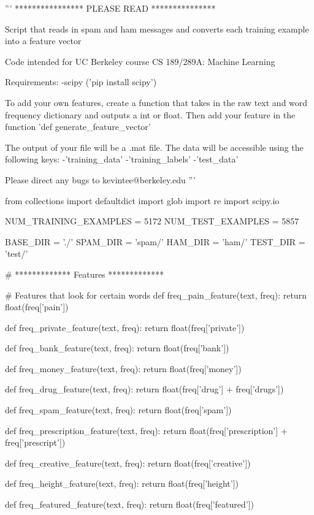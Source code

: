 \documentclass[11pt]{article}
\begin{document}
\begin{python}
'''
**************** PLEASE READ ***************

Script that reads in spam and ham messages and converts each training example
into a feature vector

Code intended for UC Berkeley course CS 189/289A: Machine Learning

Requirements:
-scipy ('pip install scipy')

To add your own features, create a function that takes in the raw text and
word frequency dictionary and outputs a int or float. Then add your feature
in the function 'def generate_feature_vector'

The output of your file will be a .mat file. The data will be accessible using
the following keys:
    -'training_data'
    -'training_labels'
    -'test_data'

Please direct any bugs to kevintee@berkeley.edu
'''

from collections import defaultdict
import glob
import re
import scipy.io

NUM_TRAINING_EXAMPLES = 5172
NUM_TEST_EXAMPLES = 5857

BASE_DIR = './'
SPAM_DIR = 'spam/'
HAM_DIR = 'ham/'
TEST_DIR = 'test/'

# ************* Features *************

# Features that look for certain words
def freq_pain_feature(text, freq):
    return float(freq['pain'])

def freq_private_feature(text, freq):
    return float(freq['private'])

def freq_bank_feature(text, freq):
    return float(freq['bank'])

def freq_money_feature(text, freq):
    return float(freq['money'])

def freq_drug_feature(text, freq):
    return float(freq['drug'] + freq['drugs'])

def freq_spam_feature(text, freq):
    return float(freq['spam'])

def freq_prescription_feature(text, freq):
    return float(freq['prescription'] + freq['prescript'])

def freq_creative_feature(text, freq):
    return float(freq['creative'])

def freq_height_feature(text, freq):
    return float(freq['height'])

def freq_featured_feature(text, freq):
    return float(freq['featured'])


\end{python}
\end{document}
